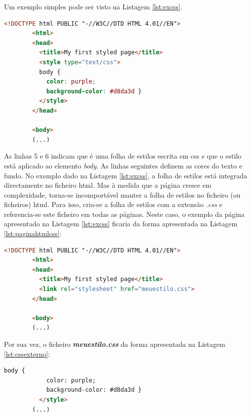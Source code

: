 Um exemplo simples pode ser visto na Listagem \ref{lst:excss}.

\begin{minipage}{0.9\linewidth}
	\begin{lstlisting}[language=HTML, caption=Exemplo \acrshort{css} incluído na página \acrshort{html} \cite{Startingcss}, label=lst:excss]
		<!DOCTYPE html PUBLIC "-//W3C//DTD HTML 4.01//EN">
		<html>
		<head>
		  <title>My first styled page</title>
		  <style type="text/css">
		  body {
			color: purple;
			background-color: #d8da3d }
		  </style>
		</head>
		
		<body>
		(...)
	\end{lstlisting}
\end{minipage}

As linhas 5 e 6 indicam que é uma folha de estilos escrita em \acrshort{css} e que o estilo está aplicado ao elemento \textit{body}. As linhas seguintes definem as cores do texto e fundo. No exemplo dado na Listagem \ref{lst:excss}, a folha de estilos está integrada directamente no ficheiro \acrshort{html}. Mas à medida que a página cresce em complexidade, torna-se incomportável manter a folha de estilos no ficheiro (ou ficheiros) \acrshort{html}. Para isso, cria-se a folha de estilos com a extensão \textit{.css} e referencia-se este ficheiro em todas as páginas. Neste caso, o exemplo da página apresentado na Listagem \ref{lst:excss} ficaria da forma apresentada na Listagem \ref{lst:paginahtmlcss}:

\begin{minipage}{0.9\linewidth}
	\begin{lstlisting}[language=HTML, caption=Exemplo da página \acrshort{html} com o \acrshort{css} definida externamente \cite{Startingcss}, label=lst:paginahtmlcss]
		<!DOCTYPE html PUBLIC "-//W3C//DTD HTML 4.01//EN">
		<html>
		<head>
		  <title>My first styled page</title>
		  <link rel="stylesheet" href="meuestilo.css">
		</head>
		
		<body>
		(...)
	\end{lstlisting}
\end{minipage}

Por sua vez, o ficheiro \textit{\textbf{meuestilo.css}} da forma apresentada na Listagem \ref{lst:cssexterno}:

\begin{minipage}{0.9\linewidth}
	\begin{lstlisting}[language=HTML, caption=Exemplo do \acrshort{css} definido externamente \cite{Startingcss}, label=lst:cssexterno]
		body {
			color: purple;
			background-color: #d8da3d }
		  </style>
		(...)
	\end{lstlisting}
\end{minipage}


